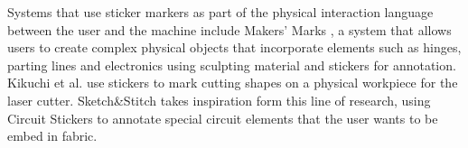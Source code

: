 Systems that use sticker markers as part of the physical interaction language between the user and the machine include Makers' Marks \cite{savage2015makers}, a system that allows users to create complex physical objects that incorporate elements such as hinges, parting lines and electronics using sculpting material and stickers for annotation. Kikuchi et al. \cite{Kikuchi:2016:MML:2839462.2856549} use stickers to mark cutting shapes on a physical workpiece for the laser cutter. Sketch\&Stitch takes inspiration form this line of research, using Circuit Stickers to annotate special circuit elements that the user wants to be embed in fabric.



















